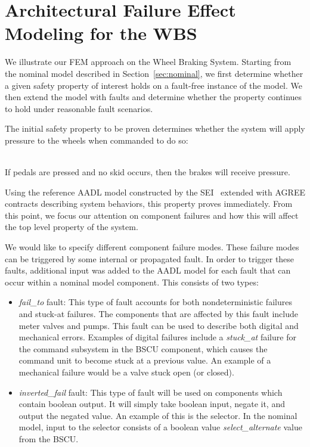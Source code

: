 \section{Architectural Failure Effect Modeling for the WBS}

We illustrate our FEM approach on the Wheel Braking System.  Starting from the nominal model described in Section~\ref{sec:nominal}, we first determine whether a given safety property of interest holds on a fault-free instance of the model.  We then extend the model with faults and determine whether the property continues to hold under reasonable fault scenarios.

The initial safety property to be proven determines whether the system will apply pressure to the wheels when commanded to do so: 

\begin{tt} 
\  \\ 
If pedals are pressed and no skid occurs, then the brakes will receive pressure. \\
\end{tt}

\noindent Using the reference AADL model constructed by the SEI~\cite{SEI:AADL} extended with AGREE contracts describing system behaviors, this property proves immediately.  From this point, we focus our attention on component failures and how this will affect the top level property of the system.

We would like to specify different component failure modes. These failure modes can be triggered by some internal or propagated fault. In order to trigger these faults, additional input was added to the AADL model for each fault that can occur within a nominal model component. This consists of two types: 

\begin{itemize}
\item \textit{fail\_to} fault: This type of fault accounts for both nondeterministic failures and stuck-at failures. The components that are affected by this fault include meter valves and pumps. This fault can be used to describe both digital and mechanical errors. Examples of digital failures include a \textit{stuck\_at} failure for the command subsystem in the BSCU component, which causes the command unit to become stuck at a previous value. An example of a mechanical failure would be a valve stuck open (or closed). 


\item \textit{inverted\_fail} fault: This type of fault will be used on components which contain boolean output. It will simply take boolean input, negate it, and output the negated value. An example of this is the selector. In the nominal model, input to the selector consists of a boolean value \textit{select\_alternate} value from the BSCU. 

\end{itemize}

